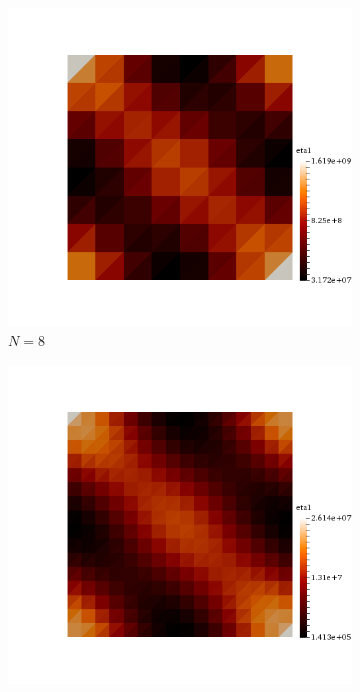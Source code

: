 \begin{figure}[h!]
  \centering
  \begin{subfigure}[b]{0.24\textwidth}
    \includegraphics[width=\textwidth,height=\textheight,keepaspectratio,height=\textheight,keepaspectratio]{figures/2_mpet/biomedical/space/eta1_8.png}
    \caption{$N=8$}
  \end{subfigure}
  \begin{subfigure}[b]{0.24\textwidth}
    \includegraphics[width=\textwidth,height=\textheight,keepaspectratio,height=\textheight,keepaspectratio]{figures/2_mpet/biomedical/space/eta1_16.png}

\end{subfigure}
\end{figure}
